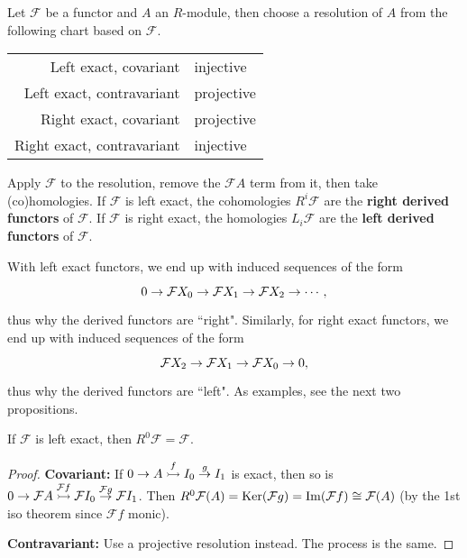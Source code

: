 \documentclass[twoside,10pt]{report}
\begin{document}
\begin{defn}[]
Let $\mathcal{F}$ be a functor and $A$ an $R$-module, then choose a resolution of $A$ from the following chart based on $\mathcal{F}$.
\begin{center}
	\begin{tabular}{r l}
		Left exact, covariant & \qquad injective \\
		Left exact, contravariant & \qquad projective \\
		Right exact, covariant & \qquad projective \\
		Right exact, contravariant & \qquad injective
	\end{tabular}
\end{center}
Apply $\mathcal{F}$ to the resolution, remove the $\mathcal{F}A$ term from it, then take (co)homologies. If $\mathcal{F}$ is left exact, the cohomologies $R^{i}\mathcal{F}$ are the \textbf{right derived functors} of $\mathcal{F}$. If $\mathcal{F}$ is right exact, the homologies $L_{i}\mathcal{F}$ are the \textbf{left derived functors} of $\mathcal{F}$.
\end{defn}


With left exact functors, we end up with induced sequences of the form
\[
\begin{tikzcd}
	0 \to \mathcal{F}X_0 \to \mathcal{F}X_1 \to \mathcal{F}X_2 \to \cdots,
\end{tikzcd}
\] thus why the derived functors are ``right". Similarly, for right exact functors, we end up with induced sequences of the form
\[
\begin{tikzcd}
	\mathcal{F}X_2 \to \mathcal{F}X_1\to \mathcal{F}X_0\to 0,
\end{tikzcd}
\] thus why the derived functors are ``left". As examples, see the next two propositions.




\begin{prop}
	\label{left-exact-right-0}
	If $\mathcal{F}$ is left exact, then $R^0\mathcal{F}=\mathcal{F}$.
\end{prop}
\begin{proof}
	\textbf{Covariant:} If $0\to A\stackrel{f}{\rightarrowtail } I_0 \stackrel{g}{\to } I_1$ is exact, then so is $0\to \mathcal{F}A\stackrel{\mathcal{F}f}{\rightarrowtail } \mathcal{F}I_0\stackrel{\mathcal{F}g}{\to } \mathcal{F}I_1 $. Then $R^{0}\mathcal{F}(A) = \operatorname{Ker} (\mathcal{F}g) = \operatorname{Im} (\mathcal{F}f) \cong \mathcal{F}(A)$ (by the 1st iso theorem since $\mathcal{F}f$ monic).

	\textbf{Contravariant:} Use a projective resolution instead. The process is the same.
\end{proof}
\end{document}
